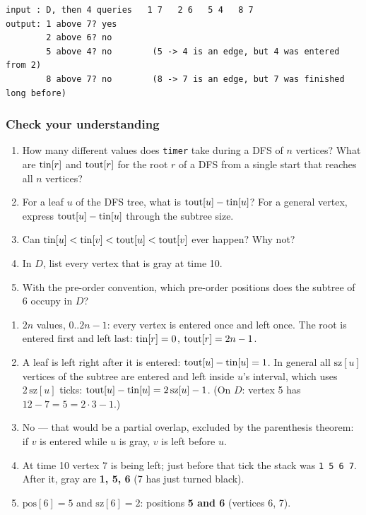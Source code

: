 \begin{lstlisting}[style=trace]
input : D, then 4 queries   1 7   2 6   5 4   8 7
output: 1 above 7? yes
        2 above 6? no
        5 above 4? no        (5 -> 4 is an edge, but 4 was entered from 2)
        8 above 7? no        (8 -> 7 is an edge, but 7 was finished long before)
\end{lstlisting}

\subsubsection*{Check your understanding}

\begin{enumerate}[leftmargin=*]
    \item How many different values does \texttt{timer} take during a DFS of $n$ vertices? What are $\mathrm{tin}[r]$ and $\mathrm{tout}[r]$ for the root $r$ of a DFS from a single start that reaches all $n$ vertices?
    \item For a leaf $u$ of the DFS tree, what is $\mathrm{tout}[u] - \mathrm{tin}[u]$? For a general vertex, express $\mathrm{tout}[u] - \mathrm{tin}[u]$ through the subtree size.
    \item Can $\mathrm{tin}[u] < \mathrm{tin}[v] < \mathrm{tout}[u] < \mathrm{tout}[v]$ ever happen? Why not?
    \item In $D$, list every vertex that is gray at time 10.
    \item With the pre-order convention, which pre-order positions does the subtree of 6 occupy in $D$?
\end{enumerate}

\begin{solutionbox}[Answers]
\begin{enumerate}[leftmargin=*]
    \item $2n$ values, $0..2n-1$: every vertex is entered once and left once. The root is entered first and left last: $\mathrm{tin}[r] = 0$, $\mathrm{tout}[r] = 2n-1$.
    \item A leaf is left right after it is entered: $\mathrm{tout}[u] - \mathrm{tin}[u] = 1$. In general all $\mathrm{sz}[u]$ vertices of the subtree are entered and left inside $u$'s interval, which uses $2\,\mathrm{sz}[u]$ ticks: $\mathrm{tout}[u] - \mathrm{tin}[u] = 2\,\mathrm{sz}[u] - 1$. (On $D$: vertex 5 has $12 - 7 = 5 = 2 \cdot 3 - 1$.)
    \item No --- that would be a partial overlap, excluded by the parenthesis theorem: if $v$ is entered while $u$ is gray, $v$ is left before $u$.
    \item At time 10 vertex 7 is being left; just before that tick the stack was \texttt{1 5 6 7}. After it, gray are \textbf{1, 5, 6} (7 has just turned black).
    \item $\mathrm{pos}[6] = 5$ and $\mathrm{sz}[6] = 2$: positions \textbf{5 and 6} (vertices 6, 7).
\end{enumerate}
\end{solutionbox}
